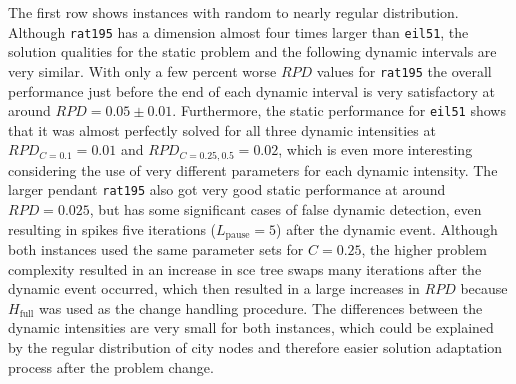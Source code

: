 The first row shows instances with random to nearly regular distribution. Although \texttt{rat195} has a dimension almost four times larger than \texttt{eil51}, the solution qualities for the static problem and the following dynamic intervals are very similar. With only a few percent worse $RPD$ values for \texttt{rat195} the overall performance just before the end of each dynamic interval is very satisfactory at around $RPD=0.05 \pm 0.01$. Furthermore, the static performance for \texttt{eil51} shows that it was almost perfectly solved for all three dynamic intensities at $RPD_{C=0.1}=0.01$ and $RPD_{C=0.25,0.5}=0.02$, which is even more interesting considering the use of very different parameters for each dynamic intensity. The larger pendant \texttt{rat195} also got very good static performance at around $RPD=0.025$, but has some significant cases of false dynamic detection, even resulting in spikes five iterations ($L_\text{pause} = 5$) after the dynamic event. 
Although both instances used the same parameter sets for $C=0.25$, the higher problem complexity resulted in an increase in \gls{sce} tree swaps many iterations after the dynamic event occurred, which then resulted in a large increases in $RPD$ because $H_\text{full}$ was used as the change handling procedure. 
The differences between the dynamic intensities are very small for both instances, which could be explained by the regular distribution of city nodes and therefore easier solution adaptation process after the problem change.


